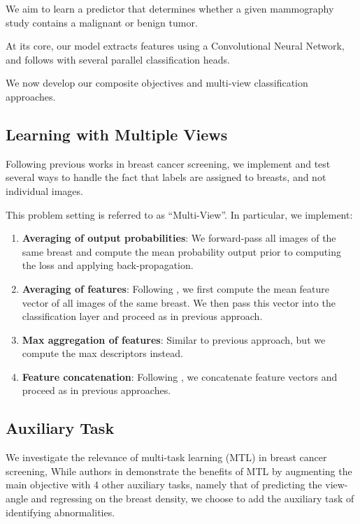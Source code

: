 \documentclass[11pt]{article}
\begin{document}
We aim to learn a predictor that determines whether a given mammography study
contains a malignant or benign tumor.

At its core, our model extracts features using a Convolutional Neural Network,
and follows with several parallel classification heads.

We now develop our composite objectives and multi-view classification approaches.
\subsection{\label{multiview}Learning with Multiple Views}
\label{sec:org903aaf2}

Following previous works in breast cancer screening,
we implement and test several ways to handle the fact that
labels are assigned to breasts, and not individual images.

This problem setting is referred to as ``Multi-View''.
In particular, we implement:

\begin{enumerate}
\item \textbf{Averaging of output probabilities}:  We forward-pass all images of the same breast
and compute the mean probability output prior to computing the loss and applying
back-propagation.
\item \textbf{Averaging of features}: Following \autocite{geras17} \autocite{seeland21}, we first compute the mean feature vector of all images of the same
breast. We then pass this vector into the classification layer and proceed as in
previous approach.
\item \textbf{Max aggregation of features}: Similar to previous approach, but we compute the max descriptors instead.
\item \textbf{Feature concatenation}: Following \autocite{wu19} \autocite{chen22}, we concatenate feature
vectors and proceed as in previous approaches.
\end{enumerate}
\subsection{Auxiliary Task}
\label{sec:org058e198}

We investigate the relevance of multi-task learning (MTL) in breast cancer screening,
While authors in \autocite{tardy22} demonstrate the benefits of MTL
by augmenting the main objective with
4 other auxiliary tasks, namely that of predicting the view-angle and
regressing on the breast density,
we choose to add the auxiliary task of identifying abnormalities.
\end{document}
